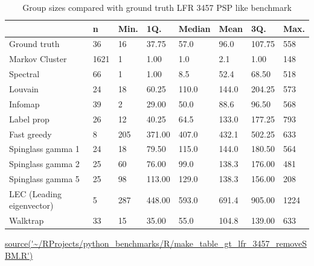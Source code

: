 \begin{table}[ht]
\centering
\setlength{\extrarowheight}{2pt}
\begin{tabular}{llllllll}
  \toprule
 & n & Min. & 1Q. & Median & Mean & 3Q. & Max. \\ 
  \midrule
Ground truth & 36 & 16 & 37.75 & 57.0 & 96.0 & 107.75 & 558 \\ 
 Markov Cluster & 1621 & 1 & 1.00 & 1.0 & 2.1 & 1.00 & 148 \\ 
 Spectral & 66 & 1 & 1.00 & 8.5 & 52.4 & 68.50 & 518 \\ 
  Louvain & 24 & 18 & 60.25 & 110.0 & 144.0 & 204.25 & 573 \\ 
  Infomap & 39 & 2 & 29.00 & 50.0 & 88.6 & 96.50 & 568 \\ 
  Label prop & 26 & 12 & 40.25 & 64.5 & 133.0 & 177.25 & 793 \\ 
  Fast greedy & 8 & 205 & 371.00 & 407.0 & 432.1 & 502.25 & 633 \\ 
  Spinglass gamma 1 & 24 & 18 & 79.50 & 115.0 & 144.0 & 180.50 & 564 \\ 
  Spinglass gamma 2 & 25 & 60 & 76.00 & 99.0 & 138.3 & 176.00 & 481 \\ 
  Spinglass gamma 5 & 25 & 98 & 113.00 & 129.0 & 138.3 & 156.00 & 208 \\
  LEC (Leading eigenvector) & 5 & 287 & 448.00 & 593.0 & 691.4 & 905.00 & 1224 \\ 
  Walktrap & 33 & 15 & 35.00 & 55.0 & 104.8 & 139.00 & 633 \\ 
   \bottomrule
\end{tabular}
\caption{Group sizes compared with ground truth LFR 3457 PSP like benchmark} 
\tiny\url{source('~/RProjects/python_benchmarks/R/make_table_gt_lfr_3457_removeSBM.R')}
\label{tab:Group sizes compared with ground truth LFR 3457 PSP like benchmark}
\end{table}



